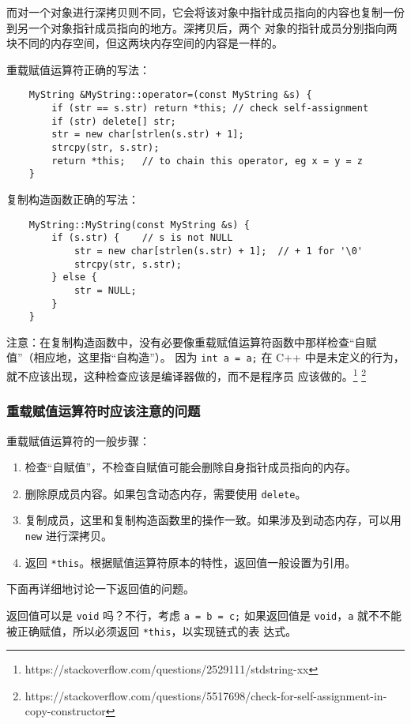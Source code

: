 \documentclass[UTF8]{ctexart}
\begin{document}
而对一个对象进行深拷贝则不同，它会将该对象中指针成员指向的内容也复制一份到另一个对象指针成员指向的地方。深拷贝后，两个
对象的指针成员分别指向两块不同的内存空间，但这两块内存空间的内容是一样的。

重载赋值运算符正确的写法：
\begin{verbatim}
    MyString &MyString::operator=(const MyString &s) {
        if (str == s.str) return *this; // check self-assignment
        if (str) delete[] str;
        str = new char[strlen(s.str) + 1];
        strcpy(str, s.str);
        return *this;   // to chain this operator, eg x = y = z
    }
\end{verbatim}

复制构造函数正确的写法：
\begin{verbatim}
    MyString::MyString(const MyString &s) {
        if (s.str) {    // s is not NULL
            str = new char[strlen(s.str) + 1];  // + 1 for '\0'
            strcpy(str, s.str);
        } else {
            str = NULL;
        }
    }
\end{verbatim}

注意：在复制构造函数中，没有必要像重载赋值运算符函数中那样检查“自赋值”（相应地，这里指“自构造”）。
因为 \texttt{int a = a;} 在 C++ 中是未定义的行为，就不应该出现，这种检查应该是编译器做的，而不是程序员
应该做的。\footnote{https://stackoverflow.com/questions/2529111/stdstring-xx}
\footnote{https://stackoverflow.com/questions/5517698/check-for-self-assignment-in-copy-constructor}

\subsubsection{重载赋值运算符时应该注意的问题}
重载赋值运算符的一般步骤：
\begin{enumerate}
    \item 检查“自赋值”，不检查自赋值可能会删除自身指针成员指向的内存。
    \item 删除原成员内容。如果包含动态内存，需要使用 \texttt{delete}。
    \item 复制成员，这里和复制构造函数里的操作一致。如果涉及到动态内存，可以用 \texttt{new} 进行深拷贝。
    \item 返回 \texttt{*this}。根据赋值运算符原本的特性，返回值一般设置为引用。
\end{enumerate}

下面再详细地讨论一下返回值的问题。

返回值可以是 \texttt{void} 吗？不行，考虑 \texttt{a = b = c;} 如果返回值是
\texttt{void}，\texttt{a} 就不不能被正确赋值，所以必须返回 \texttt{*this}，以实现链式的表
达式。
\end{document}
